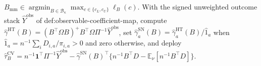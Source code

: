 \(B_{\mathrm{mm}}\in\operatorname*{argmin}_{B\in\mathcal B_\kappa}\max_{c\in\{c_L,c_U\}}\ell_B(c)\).  With the signed unweighted outcome stack \(\widehat Y^{\mathrm{obs}}\) of def:observable-coefficient-map, compute \(\widehat\gamma^{\mathrm{HT}}(B)=(B^{\top}\Omega B)^+B^{\top}\Omega\Pi^{-1}\widehat Y^{\mathrm{obs}}\), set \(\widehat\gamma_a^{\mathrm{SN}}(B)=\widehat\gamma_a^{\mathrm{HT}}(B)/\widehat 1_a\) when \(\widehat 1_a=n^{-1}\sum_iD_{i,a}/\pi_{i,a}>0\) and zero otherwise, and deploy \(\widehat\tau_B^{\mathrm{CV}}=n^{-1}\mathbf1^{\top}\Pi^{-1}\widehat Y^{\mathrm{obs}}-\widehat\gamma^{\mathrm{SN}}(B)^{\top}\{n^{-1}B^{\top}D-\mathbb E_\nu[n^{-1}B^{\top}D]\}\).